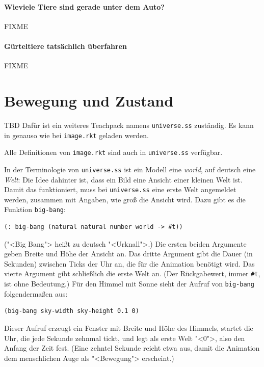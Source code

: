 \paragraph{Wieviele Tiere sind gerade unter dem Auto?} FIXME

\paragraph{Gürteltiere tatsächlich überfahren} FIXME

\section{Bewegung und Zustand}

TBD  Dafür ist ein weiteres Teachpack namens
\texttt{universe.ss} zuständig.  Es
kann in \drscheme{} genauso wie bei \texttt{image.rkt}
geladen werden.  

Alle Definitionen von
\texttt{image.rkt} sind auch in \texttt{universe.ss} verfügbar.

In der Terminologie von \texttt{universe.ss} ist ein Modell eine
\textit{world}, auf deutsch eine \textit{Welt}: Die Idee dahinter
ist, dass ein Bild eine Ansicht einer kleinen Welt ist.  Damit das
funktioniert, muss bei \texttt{universe.ss} eine erste Welt angemeldet
werden, zusammen mit Angaben, wie groß die Ansicht wird.  Dazu gibt es
die Funktion \texttt{big-bang}:
%
\begin{lstlisting}
(: big-bang (natural natural number world -> #t))
\end{lstlisting}
%
("<Big Bang"> heißt zu deutsch "<Urknall">.)
Die ersten beiden Argumente geben Breite und Höhe der Ansicht an.  Das
dritte Argument gibt die Dauer (in Sekunden) zwischen Ticks der Uhr
an, die für die Animation benötigt wird.  Das vierte Argument gibt
schließlich die erste Welt an.  (Der Rückgabewert, immer
\lstinline{#t}, ist ohne Bedeutung.)  Für den Himmel mit
Sonne sieht der Aufruf von \texttt{big-bang} folgendermaßen aus:
%
\begin{lstlisting}
(big-bang sky-width sky-height 0.1 0)
\end{lstlisting}
%
Dieser Aufruf erzeugt ein Fenster mit Breite und Höhe des Himmels,
startet die Uhr, die jede Sekunde zehnmal tickt, und legt als erste
Welt "<0">, also den Anfang der Zeit fest.  (Eine zehntel Sekunde
reicht etwa aus, damit die Animation dem menschlichen Auge als
"<Bewegung"> erscheint.)

